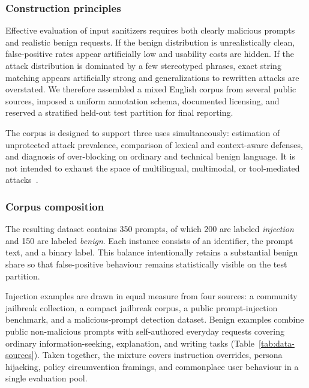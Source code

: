 \documentclass{article}
\begin{document}
\subsubsection{Construction principles}

Effective evaluation of input sanitizers requires both clearly malicious prompts and realistic benign requests.
If the benign distribution is unrealistically clean, false-positive rates appear artificially low and usability costs are hidden.
If the attack distribution is dominated by a few stereotyped phrases, exact string matching appears artificially strong and generalizations to rewritten attacks are overstated.
We therefore assembled a mixed English corpus from several public sources, imposed a uniform annotation schema, documented licensing, and reserved a stratified held-out test partition for final reporting.

The corpus is designed to support three uses simultaneously: estimation of unprotected attack prevalence, comparison of lexical and context-aware defenses, and diagnosis of over-blocking on ordinary and technical benign language.
It is not intended to exhaust the space of multilingual, multimodal, or tool-mediated attacks~\cite{yeo2025multimodal,debenedetti2024agentdojo}.

\subsubsection{Corpus composition}

The resulting dataset contains 350 prompts, of which 200 are labeled \emph{injection} and 150 are labeled \emph{benign}.
Each instance consists of an identifier, the prompt text, and a binary label.
This balance intentionally retains a substantial benign share so that false-positive behaviour remains statistically visible on the test partition.

Injection examples are drawn in equal measure from four sources: a community jailbreak collection, a compact jailbreak corpus, a public prompt-injection benchmark, and a malicious-prompt detection dataset.
Benign examples combine public non-malicious prompts with self-authored everyday requests covering ordinary information-seeking, explanation, and writing tasks (Table~\ref{tab:data-sources}).
Taken together, the mixture covers instruction overrides, persona hijacking, policy circumvention framings, and commonplace user behaviour in a single evaluation pool.
\end{document}
